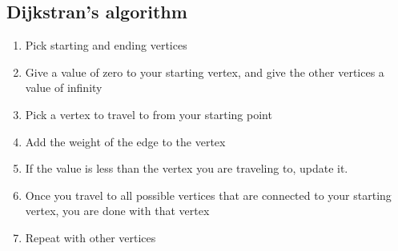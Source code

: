\documentclass{report}
\begin{document}
    \subsection{Dijkstran's algorithm}
    \bigbreak \noindent 
    \begin{enumerate}
        \item Pick starting and ending vertices
        \item Give a value of zero to your starting vertex, and give the other vertices a value of infinity
        \item Pick a vertex to travel to from your starting point
        \item Add the weight of the edge to the vertex
        \item If the value is less than the vertex you are traveling to, update it.
        \item Once you travel to all possible vertices that are connected to your starting vertex, you are done with that vertex
        \item Repeat with other vertices 
    \end{enumerate}
    








        





    
    
    
    
    
    

     
\end{document}
